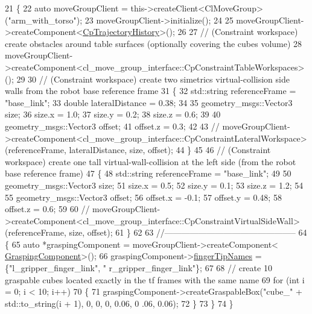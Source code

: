 \begin{DoxyCode}
21         \{
22             \textcolor{keyword}{auto} moveGroupClient = this->createClient<ClMoveGroup>(\textcolor{stringliteral}{"arm\_with\_torso"});
23             moveGroupClient->initialize();
24 
25             moveGroupClient->createComponent<\hyperlink{classcl__move__group__interface_1_1CpTrajectoryHistory}{CpTrajectoryHistory}>();
26 
27             \textcolor{comment}{// (Constraint workspace) create obstacles around table surfaces (optionally covering the cubes
       volume)}
28             moveGroupClient->createComponent<cl\_move\_group\_interface::CpConstraintTableWorkspaces>();
29 
30             \textcolor{comment}{// (Constraint workspace) create two simetrics virtual-collision side walls from the robot base
       reference frame}
31             \{
32                 std::string referenceFrame = \textcolor{stringliteral}{"base\_link"};
33                 \textcolor{keywordtype}{double} lateralDistance = 0.38;
34 
35                 geometry\_msgs::Vector3 size;
36                 size.x = 1.0;
37                 size.y = 0.2;
38                 size.z = 0.6;
39 
40                 geometry\_msgs::Vector3 offset;
41                 offset.z = 0.3;
42 
43                 \textcolor{comment}{//
      moveGroupClient->createComponent<cl\_move\_group\_interface::CpConstraintLateralWorkspace>(referenceFrame, lateralDistance, size, offset);}
44             \}
45 
46             \textcolor{comment}{// (Constraint workspace) create one tall virtual-wall-collision at the left side (from the
       robot base reference frame)}
47             \{
48                 std::string referenceFrame = \textcolor{stringliteral}{"base\_link"};
49 
50                 geometry\_msgs::Vector3 size;
51                 size.x = 0.5;
52                 size.y = 0.1;
53                 size.z = 1.2;
54 
55                 geometry\_msgs::Vector3 offset;
56                 offset.x = -0.1;
57                 offset.y = 0.48;
58                 offset.z = 0.6;
59 
60                 \textcolor{comment}{//
      moveGroupClient->createComponent<cl\_move\_group\_interface::CpConstraintVirtualSideWall>(referenceFrame, size, offset);}
61             \}
62 
63             \textcolor{comment}{//-----------------------------------------------}
64             \{
65                 \textcolor{keyword}{auto} *graspingComponent = moveGroupClient->createComponent<
      \hyperlink{classcl__move__group__interface_1_1GraspingComponent}{GraspingComponent}>();
66                 graspingComponent->\hyperlink{classcl__move__group__interface_1_1GraspingComponent_afc08a0abc3220a377d0bbf798383a42a}{fingerTipNames} = \{\textcolor{stringliteral}{"l\_gripper\_finger\_link"}, \textcolor{stringliteral}{"
      r\_gripper\_finger\_link"}\};
67 
68                 \textcolor{comment}{// create 10 graspable cubes located exactly in the tf frames with the same name}
69                 \textcolor{keywordflow}{for} (\textcolor{keywordtype}{int} i = 0; i < 10; i++)
70                 \{
71                     graspingComponent->createGraspableBox(\textcolor{stringliteral}{"cube\_"} + std::to\_string(i + 1), 0, 0, 0, 0.06, 0
      .06, 0.06);
72                 \}
73             \}
74         \}
\end{DoxyCode}


